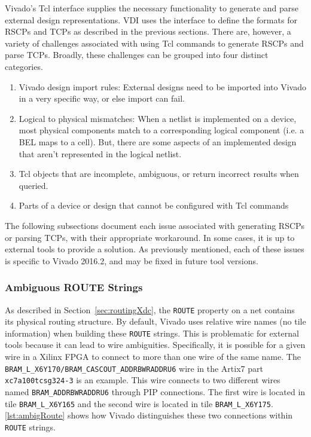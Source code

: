Vivado's Tcl interface supplies the necessary functionality to generate and
parse external design representations. VDI uses the interface to define the
formats for RSCPs and TCPs as described in the previous sections. There are,
however, a variety of challenges associated with using Tcl commands to generate
RSCPs and parse TCPs. Broadly, these challenges can be grouped into four
distinct categories.

\begin{enumerate}
  \item Vivado design import rules: External designs need to be imported
  into Vivado in a very specific way, or else import can fail. 
  \item Logical to physical mismatches: When a netlist is implemented on a
  device, most physical components match to a corresponding logical component
  (i.e. a BEL maps to a cell). But, there are some aspects of an
  implemented design that aren't represented in the logical netlist.
  \item Tcl objects that are incomplete, ambiguous, or return incorrect
  results when queried.
  \item Parts of a device or design that cannot be configured with Tcl commands
\end{enumerate}

\noindent The following subsections document each issue associated with
generating RSCPs or parsing TCPs, with their appropriate workaround. In some
cases, it is up to external tools to provide a solution. As previously
mentioned, each of these issues is specific to Vivado 2016.2, and may be fixed
in future tool versions.


\subsubsection{Ambiguous ROUTE Strings} \label{sec:routeStrings}

As described in Section~\ref{sec:routingXdc}, the \texttt{ROUTE} property
on a net contains its physical routing structure. By default, Vivado uses
relative wire names (no tile information) when building these \texttt{ROUTE}
strings. This is problematic for external tools because it can lead to wire
ambiguities. Specifically, it is possible for a given wire in a Xilinx FPGA
to connect to more than one wire of the same name. The 
\texttt{BRAM\_L\_X6Y170/BRAM\_CASCOUT\_ADDRBWRADDRU6} wire in the Artix7 part
\texttt{xc7a100tcsg324-3} is an example. This wire connects to two different
wires named \texttt{BRAM\_ADDRBWRADDRU6} through PIP connections.
The first wire is located in tile \texttt{BRAM\_L\_X6Y165} and the second wire
is located in tile \texttt{BRAM\_L\_X6Y175}. \autoref{lst:ambigRoute} shows how
Vivado distinguishes these two connections within \texttt{ROUTE} strings.


